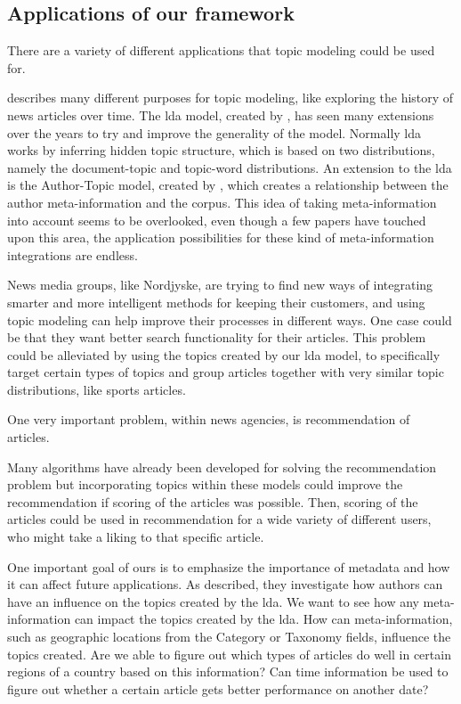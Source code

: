 \subsection{Applications of our framework}\label{sec:appendix_applications}
There are a variety of different applications that topic modeling could be used for. 

\citet{Probabilistic_Topic_Models} describes many different purposes for topic modeling, like exploring the history of news articles over time.
The \gls{lda} model, created by \citet{blei2003latent}, has seen many extensions over the years to try and improve the generality of the model.
Normally \gls{lda} works by inferring hidden topic structure, which is based on two distributions, namely the document-topic and topic-word distributions.
An extension to the \gls{lda} is the Author-Topic model, created by \citet{author_topic_2012}, which creates a relationship between the author meta-information and the corpus.
This idea of taking meta-information into account seems to be overlooked, even though a few papers have touched upon this area, the application possibilities for these kind of meta-information integrations are endless.

News media groups, like Nordjyske, are trying to find new ways of integrating smarter and more intelligent methods for keeping their customers, and using topic modeling can help improve their processes in different ways.
One case could be that they want better search functionality for their articles.
This problem could be alleviated by using the topics created by our \gls{lda} model, to specifically target certain types of topics and group articles together with very similar topic distributions, like sports articles.

One very important problem, within news agencies, is recommendation of articles.

Many algorithms have already been developed for solving the recommendation problem but incorporating topics within these models could improve the recommendation if scoring of the articles was possible.
Then, scoring of the articles could be used in recommendation for a wide variety of different users, who might take a liking to that specific article.

One important goal of ours is to emphasize the importance of metadata and how it can affect future applications.
As \citet{author_topic_2012} described, they investigate how authors can have an influence on the topics created by the \gls{lda}.
We want to see how any meta-information can impact the topics created by the \gls{lda}. 
How can meta-information, such as geographic locations from the Category or Taxonomy fields, influence the topics created.
Are we able to figure out which types of articles do well in certain regions of a country based on this information? 
Can time information be used to figure out whether a certain article gets better performance on another date?
